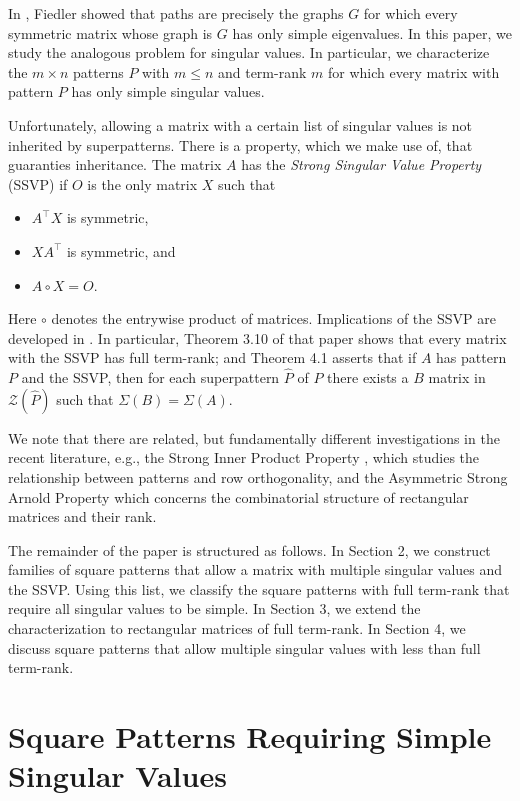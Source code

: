 \documentclass[preprint,12pt]{elsarticle}
\newcommand{\trans  }{^\top}
\begin{document}
In \cite{FIEDLER1969191}, Fiedler showed that paths are precisely the graphs $G$ for which 
every symmetric matrix whose graph is $G$
has only simple eigenvalues.  In this paper, we study the analogous problem 
for singular values.
In particular, we characterize the $m\times n$ patterns $P$ with $m\leq n$ and term-rank $m$ for which every matrix with pattern $P$ has only simple singular values. 

Unfortunately, allowing a matrix with 
a certain  list of singular values is not inherited by superpatterns. There is a property, which we make use of, that 
 guaranties inheritance. 
The matrix $A$ has the \textit{Strong Singular Value Property} (SSVP) if $O$ is the only matrix $X$ such that
\begin{itemize}
    \item[(a)] $A\trans X$ is symmetric,
    \item[(b)] $X A\trans$ is symmetric, and
    \item[(c)] $A \circ X = O$.
\end{itemize}
Here $\circ$ denotes the entrywise product of matrices. 
Implications of the SSVP are developed 
in \cite{cheung2025strongsingularvalueproperty}.
In particular, 
Theorem 3.10 of that paper shows that every matrix  with the SSVP has full term-rank;
and 
Theorem 4.1  asserts that 
if $A$ has pattern $P$ and the SSVP, then 
for each superpattern $\widehat{P}$ of $P$ there exists a $B$ matrix in $\mathcal{Z}(\widehat{P})$ 
such that $\Sigma(B)=\Sigma(A)$. 

We note that there are related, but fundamentally different investigations in the recent literature, e.g., 
the Strong Inner Product Property \cite{CS2020}, which studies the relationship between patterns and row orthogonality, and the Asymmetric Strong Arnold Property \cite{ARAV2024254} which concerns the combinatorial structure of rectangular matrices and their rank.


The remainder of the paper is structured as follows. In Section 2, we construct families of square patterns that allow
a matrix with multiple singular values  and the SSVP. Using this list, we classify the  square patterns with full term-rank that require all singular values to be simple. 
In Section 3, we extend the characterization to rectangular matrices of full term-rank. In Section 4, we discuss square patterns that allow multiple singular values with less than  full term-rank. 


\section{Square Patterns Requiring Simple Singular Values}
\end{document}
